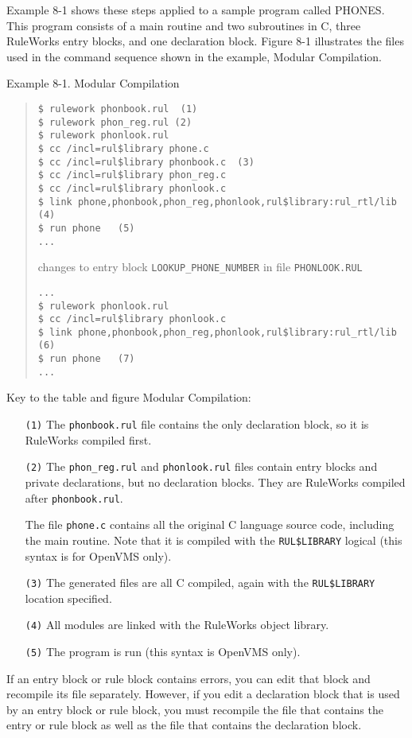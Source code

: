 Example 8-1 shows these steps applied to a sample program
called PHONES. This program consists of a main routine
and two subroutines in C, three RuleWorks entry blocks,
and one declaration block. Figure 8-1 illustrates the
files used in the command sequence shown in the example,
Modular Compilation.

Example 8-1. Modular Compilation
\begin{quote}
\begin{verbatim}
$ rulework phonbook.rul  (1)
$ rulework phon_reg.rul (2)
$ rulework phonlook.rul
$ cc /incl=rul$library phone.c
$ cc /incl=rul$library phonbook.c  (3)
$ cc /incl=rul$library phon_reg.c
$ cc /incl=rul$library phonlook.c
$ link phone,phonbook,phon_reg,phonlook,rul$library:rul_rtl/lib (4)
$ run phone   (5)
...
\end{verbatim}
changes to entry block \verb|LOOKUP_PHONE_NUMBER| in file
\verb|PHONLOOK.RUL|
\begin{verbatim}
...
$ rulework phonlook.rul
$ cc /incl=rul$library phonlook.c
$ link phone,phonbook,phon_reg,phonlook,rul$library:rul_rtl/lib (6)
$ run phone   (7)
...
\end{verbatim}
\end{quote}
Key to the table and figure Modular Compilation:
\begin{itemize}
\item[\tt{(1)}] The \verb|phonbook.rul| file contains the only
  declaration block, so it is RuleWorks compiled first.

\item[\tt{(2)}] The \verb|phon_reg.rul| and \verb|phonlook.rul| files
  contain entry blocks and private declarations, but no declaration
  blocks. They are RuleWorks compiled after \verb|phonbook.rul|.

  The file \verb|phone.c| contains all the original C language source
  code, including the main routine. Note that it is compiled with the
  \verb|RUL$LIBRARY| logical (this syntax is for OpenVMS only).

\item[\tt{(3)}] The generated files are all C compiled, again with the
  \verb|RUL$LIBRARY| location specified.

\item[\tt{(4)}] All modules are linked with the RuleWorks object
  library.

\item[\tt{(5)}] The program is run (this syntax is OpenVMS only).
\end{itemize}
If an entry block or rule block contains errors, you can edit that
block and recompile its file separately.  However, if you edit a
declaration block that is used by an entry block or rule block, you
must recompile the file that contains the entry or rule block as well
as the file that contains the declaration block.

